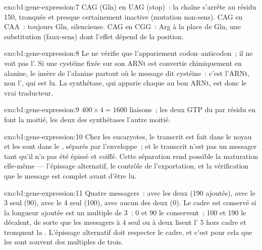 \begin{solution}{exo:b1:gene-expression:7}
CAG (Gln) en UAG (stop)~: la chaîne s'arrête au résidu 150, 
tronquée et presque certainement inactive (mutation non-sens). CAG en
CAA~: toujours Gln, silencieuse. CAG en CGG~: Arg à la place de Gln, une
substitution (faux-sens) dont l'effet dépend de la position.
\end{solution}

\begin{solution}{exo:b1:gene-expression:8}
Le  ne vérifie que l'appariement codon--anticodon~; il ne voit
pas l'. Si une cystéine fixée sur son ARNt est convertie
chimiquement en alanine, le  insère de l'alanine partout où le
message dit cystéine~: c'est l'ARNt, non l', qui est lu. La
synthétase, qui apparie chaque  au bon ARNt, est donc le vrai
traducteur.
\end{solution}

\begin{solution}{exo:b1:gene-expression:9}
$400\times 4 = 1600$ liaisons~; les deux GTP du  par résidu en
font la moitié, les deux des synthétases l'autre moitié.
\end{solution}

\begin{solution}{exo:b1:gene-expression:10}
Chez les eucaryotes, le transcrit est fait dans le noyau et les
 sont dans le , séparés par l'enveloppe~; et le
transcrit n'est pas un messager tant qu'il n'a pas été épissé et coiffé.
Cette séparation rend possible la maturation elle-même --- l'épissage
alternatif, le contrôle de l'exportation, et la vérification que le
message est complet avant d'être lu.
\end{solution}

\begin{solution}{exo:b1:gene-expression:11}
Quatre messagers~: avec les deux  (190  ajoutés), avec
le 3 seul (90), avec le 4 seul (100), avec aucun des deux (0). Le cadre
est conservé si la longueur ajoutée est un multiple de 3~: 0 et 90 le
conservent~; 100 et 190 le décalent, de sorte que les messagers à  4
seul ou à deux  lisent l' 5 hors cadre et tronquent la
. L'épissage alternatif doit respecter le cadre, et c'est pour
cela que les  sont souvent des multiples de trois.
\end{solution}

